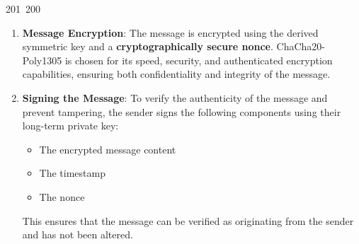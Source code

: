 201~200~\documentclass{article}
\begin{document}
\begin{enumerate}
	                                                                                                                                                                                                                                            \item \textbf{Message Encryption}: The message is encrypted using the derived symmetric key and a \textbf{cryptographically secure nonce}. ChaCha20-Poly1305 is chosen for its speed, security, and authenticated encryption capabilities, ensuring both confidentiality and integrity of the message.

	                                                                                                                                                                                                                                                    \item \textbf{Signing the Message}: To verify the authenticity of the message and prevent tampering, the sender signs the following components using their long-term private key:  
	                                                                                                                                                                                                                                                        \begin{itemize}
	                                                                                                                                                                                                                                                                \item The encrypted message content  
	                                                                                                                                                                                                                                                                        \item The timestamp  
	                                                                                                                                                                                                                                                                                \item The nonce  
	                                                                                                                                                                                                                                                                                    \end{itemize}
	                                                                                                                                                                                                                                                                                        This ensures that the message can be verified as originating from the sender and has not been altered.


\end{enumerate}
\end{document}
